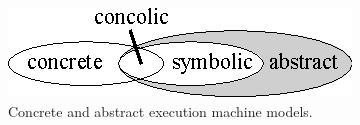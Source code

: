 
\begin{figure}[t]
\centering
\includegraphics[width=0.35\columnwidth]{images/concrete-abstract.eps} 
\caption{Concrete and abstract execution machine models.}
\label{fig:concrete-symbolic}
\end{figure}

